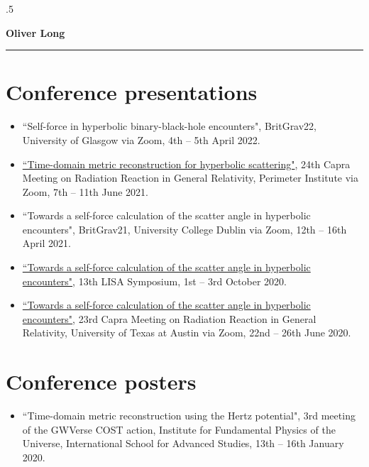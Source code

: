 \documentclass[10.5pt, oneside]{article}   	%
\begin{document}
\pagebreak\moveleft.5\hoffset\centerline{\large\bf Oliver Long} %
 
\noindent\rule{\linewidth}{0.6pt}
 
 \section*{Conference presentations}
\begin{itemize}
\item ``Self-force in hyperbolic binary-black-hole encounters", BritGrav22, University of Glasgow via Zoom, 4th -- 5th April 2022.
\item \href{https://pirsa.org/21060058}{``Time-domain metric reconstruction for hyperbolic scattering"}, 24th Capra Meeting on Radiation Reaction in General Relativity, Perimeter Institute via Zoom, 7th -- 11th June 2021.
\item ``Towards a self-force calculation of the scatter angle in hyperbolic encounters", BritGrav21, University College Dublin via Zoom, 12th -- 16th April 2021.
\item \href{https://lisasymposium13.lisamission.org/presentations/i0xMnRFWi7WKbO5f01caGDH0zPK2/7qz7uYC3qHuzj9AsC49h}{``Towards a self-force calculation of the scatter angle in hyperbolic encounters"}, 13th LISA Symposium, 1st -- 3rd October 2020.
\item \href{https://www.youtube.com/watch?v=HB-Rw5kRUfg&t=11311s}{``Towards a self-force calculation of the scatter angle in hyperbolic encounters"}, 23rd Capra Meeting on Radiation Reaction in General Relativity, University of Texas at Austin via Zoom, 22nd -- 26th June 2020.
\end{itemize} 
 
\section*{Conference posters}
\begin{itemize}
\item ``Time-domain metric reconstruction using the Hertz potential", 3rd meeting of the GWVerse COST action, Institute for Fundamental Physics of the Universe, International School for Advanced Studies, 13th -- 16th January 2020.
\end{itemize} 

 
\end{document}
